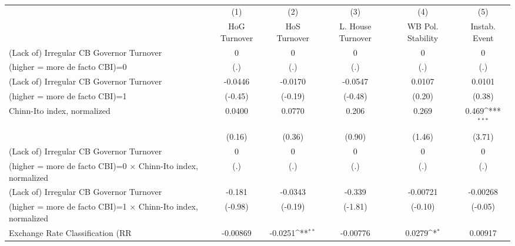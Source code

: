 \begin{table}[htbp]\centering
\def\sym#1{\ifmmode^{#1}\else\(^{#1}\)\fi}
\caption{\label{ikmultIndFEDF}}
\begin{tabular}{l*{5}{c}}
\toprule
                                        &\multicolumn{1}{c}{(1)}&\multicolumn{1}{c}{(2)}&\multicolumn{1}{c}{(3)}&\multicolumn{1}{c}{(4)}&\multicolumn{1}{c}{(5)}\\
                                        &\multicolumn{1}{c}{HoG Turnover}&\multicolumn{1}{c}{HoS Turnover}&\multicolumn{1}{c}{L. House Turnover}&\multicolumn{1}{c}{WB Pol. Stability}&\multicolumn{1}{c}{Instab. Event}\\
\midrule
(Lack of) Irregular CB Governor Turnover&        0         &        0         &        0         &        0         &        0         \\
(higher = more de facto CBI)=0          &      (.)         &      (.)         &      (.)         &      (.)         &      (.)         \\
\addlinespace
(Lack of) Irregular CB Governor Turnover&  -0.0446         &  -0.0170         &  -0.0547         &   0.0107         &   0.0101         \\
(higher = more de facto CBI)=1          &  (-0.45)         &  (-0.19)         &  (-0.48)         &   (0.20)         &   (0.38)         \\
\addlinespace
Chinn-Ito index, normalized             &   0.0400         &   0.0770         &    0.206         &    0.269         &    0.469\sym{***}\\
                                        &   (0.16)         &   (0.36)         &   (0.90)         &   (1.46)         &   (3.71)         \\
\addlinespace
(Lack of) Irregular CB Governor Turnover&        0         &        0         &        0         &        0         &        0         \\
(higher = more de facto CBI)=0 $\times$ Chinn-Ito index, normalized&      (.)         &      (.)         &      (.)         &      (.)         &      (.)         \\
\addlinespace
(Lack of) Irregular CB Governor Turnover&   -0.181         &  -0.0343         &   -0.339         & -0.00721         & -0.00268         \\
(higher = more de facto CBI)=1 $\times$ Chinn-Ito index, normalized&  (-0.98)         &  (-0.19)         &  (-1.81)         &  (-0.10)         &  (-0.05)         \\
\addlinespace
Exchange Rate Classification (RR        & -0.00869         &  -0.0251\sym{**} & -0.00776         &   0.0279\sym{*}  &  0.00917         \\

\end{tabular}
\end{table}
